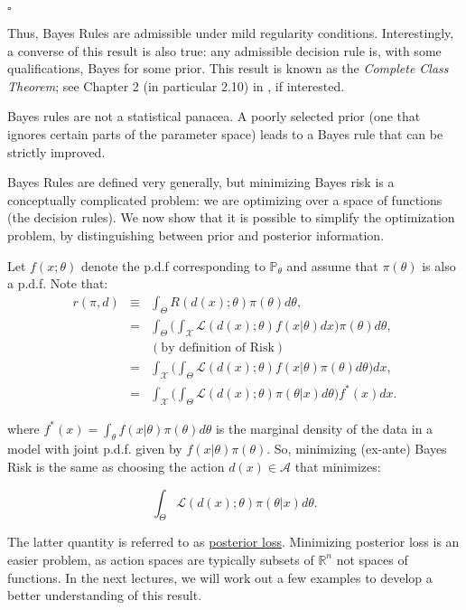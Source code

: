 \documentclass[11pt]{article} %
\begin{document}
\begin{flushright}
$\square$
\end{flushright}

\noindent Thus, Bayes Rules are admissible under mild regularity conditions. Interestingly, a converse of this result is also true: any admissible decision rule is, with some qualifications,	 Bayes for some prior. This result is known as the \emph{Complete Class Theorem}; see Chapter 2 (in particular 2.10) in \cite{Ferguson67}, if interested.  

Bayes rules are not a statistical panacea. A poorly selected prior (one that ignores certain parts of the parameter space) leads to a Bayes rule that can be strictly improved. 

Bayes Rules are defined very generally, but minimizing Bayes risk is a conceptually complicated problem: we are optimizing over a space of functions (the decision rules). We now show that it is possible to simplify the optimization problem, by distinguishing between prior and posterior information. 

Let $f(x;\theta)$ denote the p.d.f corresponding to $\mathbb{P}_{\theta}$ and assume that $\pi(\theta)$ is also a p.d.f. Note that:
\begin{eqnarray*}
r(\pi, d) &\equiv& \int_{\Theta} R(d(x); \theta ) \pi(\theta) d{\theta}, \\
&=&  \int_{\Theta}\Big( \int_{\mathcal{X}} \mathcal{L}(d(x); \theta) f(x| \theta) d x  \Big)  \pi(\theta) d{\theta}, \\
&& (\textrm{by definition of Risk}) \\
&=& \int_{\mathcal{X}}   \Big( \int_{\Theta} \mathcal{L}(d(x); \theta) f(x| \theta) \pi(\theta) d \theta  \Big)   dx, \\
&=& \int_{\mathcal{X}}   \Big( \int_{\Theta} \mathcal{L}(d(x); \theta)\pi (\theta | x) d \theta  \Big) f^*(x)  dx.
\end{eqnarray*}

\noindent where $f^*(x)= \int_{\theta} f(x|\theta) \pi(\theta) d \theta$ is the marginal density of the data in a model with joint p.d.f. given by $f(x|\theta) \pi(\theta)$. So, minimizing (ex-ante) Bayes Risk is the same as choosing the action $d(x) \in \mathcal{A}$ that minimizes: 

\[ \int_{\Theta} \mathcal{L}(d(x); \theta)\pi (\theta | x) d \theta.  \] 

\noindent The latter quantity is referred to as \underline{posterior loss}. Minimizing posterior loss is an easier problem, as action spaces are typically subsets of $\mathbb{R}^{n}$ not spaces of functions. In the next lectures, we will work out a few examples to develop a better understanding of this result. 
\end{document}
